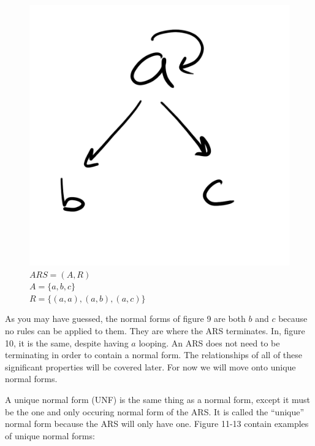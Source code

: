 \documentclass{article}
\begin{document}
\begin{figure}[H]
  \centering
  \includegraphics[scale=0.06]{gen10}
  \caption[] {
    $ARS = (A, R)$
    \\ $A=\{a, b, c\}$
    \\ $R=\{(a, a), (a, b), (a, c)\}$
    \endtabular}
\end{figure}

\medskip\noindent
As you may have guessed, the normal forms of figure 9 are both $b$ and $c$ because no rules can be applied to them. They are where the ARS terminates. In, figure 10, it is the same, despite having $a$ looping. An ARS does not need to be terminating in order to contain a normal form. The relationships of all of these significant properties will be covered later. For now we will move onto unique normal forms.

\medskip\noindent
A unique normal form (UNF) is the same thing as a normal form, except it must be the one and only occuring normal form of the ARS. It is called the “unique” normal form because the ARS will only have one. Figure 11-13 contain examples of unique normal forms:
\end{document}
